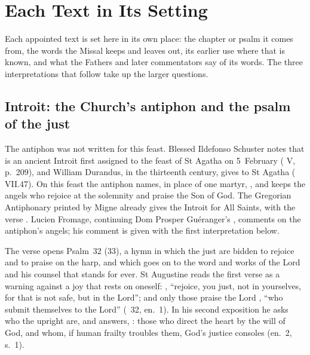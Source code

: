 \section{Each Text in Its Setting}
\label{sec:each-element}

Each appointed text is set here in its own place: the chapter or psalm it
comes from, the words the Missal keeps and leaves out, its earlier use where
that is known, and what the Fathers and later commentators say of its words.
The three interpretations that follow take up the larger questions.

\subsection{Introit: the Church's antiphon and the psalm of the just}
\label{sec:element-introit}

The antiphon was not written for this feast. Blessed Ildefonso Schuster notes
that  is an ancient Introit first assigned to the feast of St
Agatha on 5~February ( V, p.~209), and William Durandus,
in the thirteenth century, gives  to St
Agatha ( VII.47). On this feast the antiphon names, in place of
one martyr, , and keeps the angels who rejoice at the
solemnity and praise the Son of God. The Gregorian Antiphonary printed by
Migne already gives the Introit  for All
Saints, with the verse . Lucien Fromage, continuing Dom Prosper Guéranger's
, comments on the antiphon's angels; his comment is
given with the first interpretation below.

The verse opens Psalm~32 (33), a hymn in which the just are bidden to rejoice
and to praise on the harp, and which goes on to the word and works of the Lord
and his counsel that stands for ever. St Augustine reads the first verse as a
warning against a joy that rests on oneself: , ``rejoice, you just, not in
yourselves, for that is not safe, but in the Lord''; and only those praise the
Lord , ``who submit themselves to the Lord''
(\ 32, en.~1). In his second exposition he asks who the
upright are, and answers, : those who
direct the heart by the will of God, and whom, if human frailty troubles them,
God's justice consoles (en.~2, s.~1).

